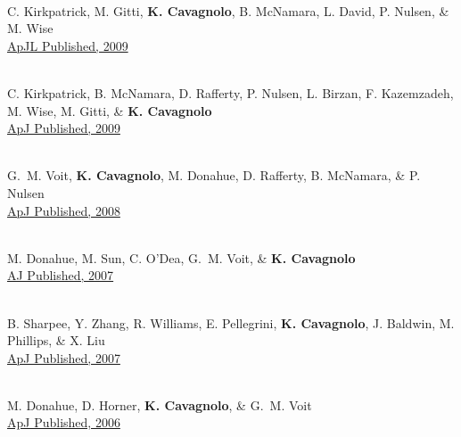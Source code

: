 \documentclass[11pt]{cv}
\newcommand{\myhead}{Cavagnolo, Publications}
\begin{document}
\begin{llist}

{}\\
C. Kirkpatrick, M. Gitti, {\bf K. Cavagnolo}, B. McNamara, L. David, P. Nulsen, \& M. Wise\\
\href{http://adsabs.harvard.edu/abs/2009arXiv0909.2252K}{ApJL Published, 2009}

{}\\
C. Kirkpatrick, B. McNamara, D. Rafferty, P. Nulsen, L. Birzan, F. Kazemzadeh, M. Wise, M. Gitti, \& {\bf K. Cavagnolo}\\
\href{http://adsabs.harvard.edu/abs/2009ApJ...697..867K}{ApJ Published, 2009}

{}\\
G.~M. Voit, {\bf K. Cavagnolo}, M. Donahue, D. Rafferty, B. McNamara, \& P. Nulsen\\
\href{http://adsabs.harvard.edu/abs/2008ApJ...681L...5V}{ApJ Published, 2008}

{}\\
M. Donahue, M. Sun, C. O'Dea, G.~M. Voit, \& {\bf K. Cavagnolo}\\
\href{http://adsabs.harvard.edu/abs/2007AJ....134...14D}{AJ Published, 2007}

{}\\
B. Sharpee, Y. Zhang, R. Williams, E. Pellegrini, {\bf K. Cavagnolo}, J. Baldwin, M. Phillips, \& X. Liu\\
\href{http://adsabs.harvard.edu/abs/2007ApJ...659.1265S}{ApJ Published, 2007}

{}\\
M. Donahue, D. Horner, {\bf K. Cavagnolo}, \& G.~M. Voit\\
\href{http://adsabs.harvard.edu/abs/2006ApJ...643..730D}{ApJ Published, 2006}

\markright{\myhead}



\end{llist}
\end{document}
